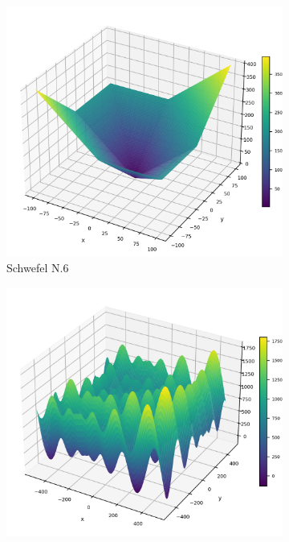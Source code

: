 \begin{figure}[p]\ContinuedFloat
\renewcommand\thesubfigure{A.\arabic{subfigure}} %
    \centering
    \begin{subfigure}{0.32\textwidth}
        \centering
        \includegraphics[width=1\textwidth]{Figures/benchmark_plots/Schwefel_N6_maximized.png}
        \caption{Schwefel N.6}
    \end{subfigure}
    \begin{subfigure}{0.32\textwidth}
        \centering
        \includegraphics[width=1\textwidth]{Figures/benchmark_plots/Shifted_Schwefel_maximized.png}

\end{subfigure}
\end{figure}
